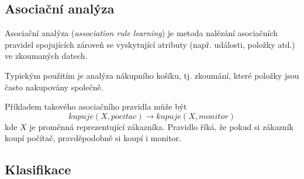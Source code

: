 \subsection{Asociační analýza}

\begin{compactitem}
    \item Asociační analýza (\textit{association rule learning}) je metoda nalézání asociačních pravidel spojujících zároveň se vyskytující atributy (např. události, položky atd.) ve zkoumaných datech.

    \item Typickým použitím je analýza nákupního košíku, tj. zkoumání, které položky jsou často nakupovány společně.

    \item Příkladem takového asociačního pravidla může být
    \begin{equation}
        kupuje(X, pocitac) \rightarrow kupuje(X, monitor)
    \end{equation}
    kde $X$ je proměnná reprezentující zákazníka. Pravidlo říká, že pokud si zákazník koupí počítač, pravděpodobně si koupí i monitor.
\end{compactitem}

\subsection{Klasifikace}

